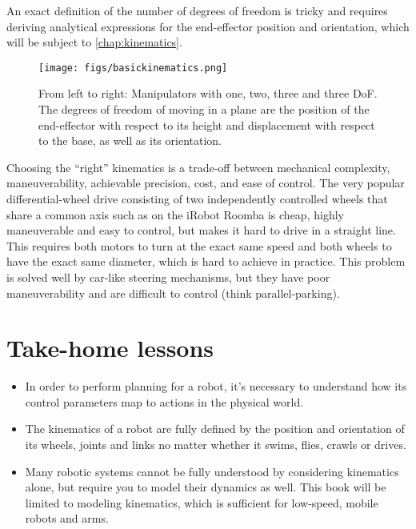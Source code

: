 An exact definition of the number of degrees of freedom is tricky and requires deriving analytical expressions for the end-effector position and orientation, which will be subject to \cref{chap:kinematics}.

\begin{figure}
	\centering
		\texttt{[image: figs/basickinematics.png]}
	\caption{From left to right: Manipulators with one, two, three and three DoF. The degrees of freedom of moving in a plane are the position of the end-effector with respect to its height and displacement with respect to the base, as well as its orientation.}
	\label{fig:basickinematics}
\end{figure}

Choosing the ``right'' kinematics is a trade-off between mechanical complexity, maneuverability, achievable precision, cost, and ease of control. The very popular differential-wheel drive consisting of two independently controlled wheels that share a common axis such as on the iRobot Roomba is cheap, highly maneuverable and easy to control, but makes it hard to drive in a straight line. This requires both motors to turn at the exact same speed and both wheels to have the exact same diameter, which is hard to achieve in practice. This problem is solved well by car-like steering mechanisms, but they have poor maneuverability and are difficult to control (think parallel-parking).


\section*{Take-home lessons}

\begin{itemize}
\item In order to perform planning for a robot, it's necessary to understand how its control parameters map to actions in the physical world.
\item The kinematics of a robot are fully defined by the position and orientation of its wheels, joints and links no matter whether it swims, flies, crawls or drives.
\item Many robotic systems cannot be fully understood by considering kinematics alone, but require you to model their dynamics as well. This book will be limited to modeling kinematics, which is sufficient for low-speed, mobile robots and arms.
\end{itemize}


